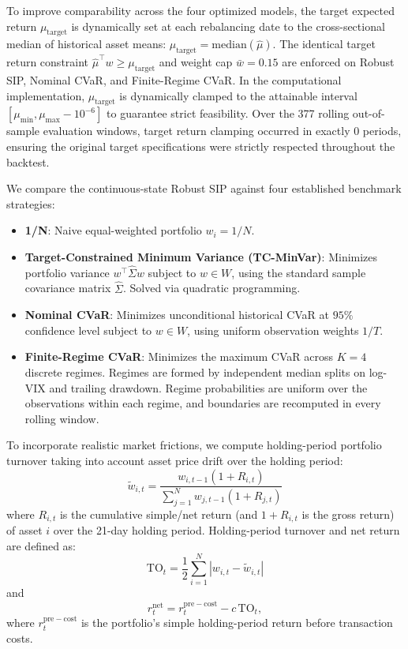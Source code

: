 \documentclass[11pt, a4paper]{article}
\begin{document}
To improve comparability across the four optimized models, the target expected return $\mu_{\text{target}}$ is dynamically set at each rebalancing date to the cross-sectional median of historical asset means: $\mu_{\text{target}} = \text{median}(\hat{\mu})$. The identical target return constraint $\hat{\mu}^\top w \ge \mu_{\text{target}}$ and weight cap $\bar{w} = 0.15$ are enforced on Robust SIP, Nominal CVaR, and Finite-Regime CVaR. In the computational implementation, $\mu_{\text{target}}$ is dynamically clamped to the attainable interval $[\mu_{\min}, \mu_{\max} - 10^{-6}]$ to guarantee strict feasibility. Over the 377 rolling out-of-sample evaluation windows, target return clamping occurred in exactly 0 periods, ensuring the original target specifications were strictly respected throughout the backtest.

We compare the continuous-state Robust SIP against four established benchmark strategies:
\begin{itemize}
    \item \textbf{1/N}: Naive equal-weighted portfolio $w_i = 1/N$.
    \item \textbf{Target-Constrained Minimum Variance (TC-MinVar)}: Minimizes portfolio variance $w^\top \widehat{\Sigma} w$ subject to $w \in W$, using the standard sample covariance matrix $\widehat{\Sigma}$. Solved via quadratic programming.
    \item \textbf{Nominal CVaR}: Minimizes unconditional historical CVaR at $95\%$ confidence level subject to $w \in W$, using uniform observation weights $1/T$.
    \item \textbf{Finite-Regime CVaR}: Minimizes the maximum CVaR across $K=4$ discrete regimes. Regimes are formed by independent median splits on log-VIX and trailing drawdown. Regime probabilities are uniform over the observations within each regime, and boundaries are recomputed in every rolling window.
\end{itemize}

To incorporate realistic market frictions, we compute holding-period portfolio turnover taking into account asset price drift over the holding period:
\begin{equation}
    \widetilde w_{i,t} = \frac{w_{i,t-1}(1+R_{i,t})}{\sum_{j=1}^N w_{j,t-1}(1+R_{j,t})}
\end{equation}
where $R_{i,t}$ is the cumulative simple/net return (and $1+R_{i,t}$ is the gross return) of asset $i$ over the 21-day holding period. Holding-period turnover and net return are defined as:
\begin{equation}
    \text{TO}_t = \frac{1}{2} \sum_{i=1}^N | w_{i,t} - \widetilde w_{i,t} |
\end{equation}
and
\begin{equation}
    r_t^{\mathrm{net}} = r_t^{\mathrm{pre-cost}} - c\,\mathrm{TO}_t,
\end{equation}
where $r_t^{\mathrm{pre-cost}}$ is the portfolio's simple holding-period return before transaction costs.
\end{document}
